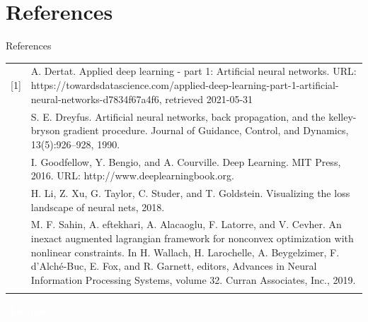 \documentclass[11pt,t]{beamer}
\begin{document}
\section*{References}
\begin{frame}[fragile]{References}
\footnotesize
\begin{tabular}{c p{}}
[1] & A. Dertat. Applied deep learning - part 1: Artificial neural networks. URL: https://towardsdatascience.com/applied-deep-learning-part-1-artificial-neural-networks-d7834f67a4f6, retrieved 2021-05-31 \\\relax
[2] & S. E. Dreyfus. Artificial neural networks, back propagation, and the kelley-bryson gradient procedure. Journal of Guidance, Control, and Dynamics, 13(5):926–928, 1990. \\\relax
[3] & I. Goodfellow, Y. Bengio, and A. Courville. Deep Learning. MIT Press, 2016. URL: http://www.deeplearningbook.org. \\\relax
[4] & H. Li, Z. Xu, G. Taylor, C. Studer, and T. Goldstein. Visualizing the loss landscape of neural nets, 2018. \\\relax
[5] & M. F. Sahin, A. eftekhari, A. Alacaoglu, F. Latorre, and V. Cevher. An inexact augmented lagrangian framework for nonconvex optimization with nonlinear constraints. In H. Wallach, H. Larochelle, A. Beygelzimer, F. d'Alché-Buc, E. Fox, and R. Garnett, editors, Advances in Neural Information Processing Systems, volume 32. Curran Associates, Inc., 2019. \\\relax
\end{tabular}
\end{frame}



\begin{frame}

\centering
\textcolor{white}{Questions}
\end{frame}
\end{document}
